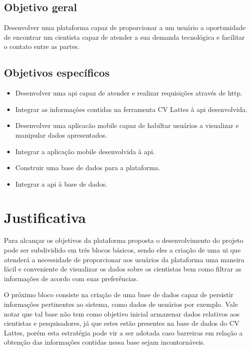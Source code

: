 \subsection{Objetivo geral}\label{subsec:objetivoGeral}

Desenvolver uma plataforma capaz de proporcionar a um usuário a oportunidade de encontrar um cientista capaz de atender a sua demanda tecnológica e facilitar o contato entre as partes.

\subsection{Objetivos específicos}\label{subsec:objetivosEspecificos}

\begin{itemize}
    \item Desenvolver uma \gls{api} capaz de atender e realizar requisições através de \gls{http}.
    \item Integrar as informações contidas na ferramenta CV Lattes à \gls{api} desenvolvida.
    \item Desenvolver uma aplicacão mobile capaz de habiltar usuários a visualizar e manipular dados apresentados.
    \item Integrar a aplicação mobile desenvolvida à \gls{api}.
    \item Construir uma base de dados para a plataforma.
    \item Integrar a \gls{api} à base de dados.
\end{itemize}

\section{Justificativa}\label{sec:justificativa}

Para alcançar os objetivos da plataforma proposta o desenvolvimento do projeto pode ser subdividido em três blocos básicos, sendo eles a criação de uma \gls{ui} que atenderá a necessidade de proporcionar aos usuários da plataforma uma maneira fácil e conveniente de visualizar os dados sobre os cientistas bem como filtrar as informações de acordo com suas preferências.

O próximo bloco consiste na criação de uma base de dados capaz de persistir informações pertinentes ao sistema, como dados de usuários por exemplo. Vale notar que tal base não tem como objetivo inicial armazenar dados relativos aos cientistas e pesquisadores, já que estes estão presentes na base de dados do CV Lattes, porém esta estratégia pode vir a ser adotada caso barreiras em relação a obtenção das informações contidas nessa base sejam incontornáveis. 

